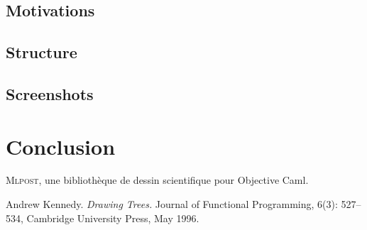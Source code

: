 \documentclass[a4paper,12pt]{article}
\newcommand{\mlpost}{\textsc{Mlpost}}
\begin{document}
\subsection{Motivations}
\subsection{Structure}
\subsection{Screenshots}
\section{Conclusion}

\begin{thebibliography}{99}
 \mlpost, une bibliothèque de dessin 
 scientifique pour Objective Caml.

Andrew Kennedy. 
\emph{Drawing Trees.}
Journal of Functional Programming, 
6(3): 527--534, Cambridge University Press, May 1996.
\end{thebibliography}
\end{document}
